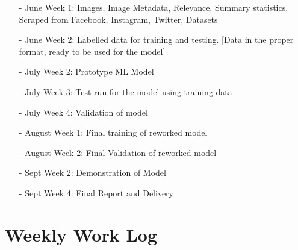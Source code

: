 \documentclass{article}
\begin{document}
\begin{itemize}
    \item [-] June Week 1: Images, Image Metadata, Relevance, Summary statistics, Scraped from Facebook, Instagram, Twitter, Datasets
    \item [-] June Week 2: Labelled data for training and testing. [Data in the proper format, ready to be used for the model]    
    \item [-] July Week 2: Prototype ML Model
    \item [-] July Week 3: Test run for the model using training data
    \item [-] July Week 4: Validation of model
    \item [-] August Week 1: Final training of reworked model 
    \item [-] August Week 2: Final Validation of reworked model
    \item [-] Sept Week 2: Demonstration of Model
    \item [-] Sept Week 4: Final Report and Delivery
\end{itemize}
\newpage %

\section{Weekly Work Log}
\end{document}
